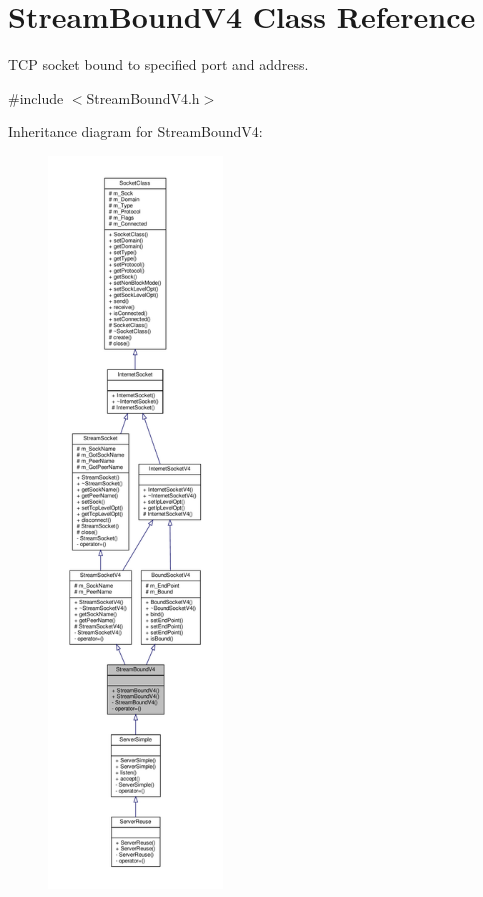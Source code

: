 \hypertarget{classStreamBoundV4}{}\section{Stream\+Bound\+V4 Class Reference}
\label{classStreamBoundV4}


T\+CP socket bound to specified port and address.  




{\ttfamily \#include $<$Stream\+Bound\+V4.\+h$>$}



Inheritance diagram for Stream\+Bound\+V4\+:\nopagebreak
\begin{figure}[H]
\begin{center}
\leavevmode
\includegraphics[height=550pt]{classStreamBoundV4__inherit__graph}
\end{center}
\end{figure}
